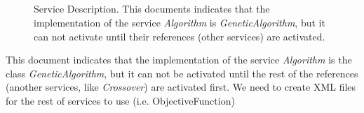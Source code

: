 \documentclass{sig-alternate}
\begin{document}
\begin{figure}[t]
{}\hlstd{\ \ %
}\hlstd{\ \ }\hlstd{}\hlstd{=}\hlstd{\hspace*{\fill}\\
}\hlstd{\ \ }\hlstd{}\hlstd{=}\hlstd{\hspace*{\fill}\\
}\hlstd{\ \ }\hlstd{}\hlstd{=}\hlstd{}\hlkwa{/$>$}\hspace*{\fill}\\
\hlstd{\ }\hlstd{}\hlstd{=}\hlstd{\hspace*{\fill}\\
}\hlstd{\ \ }\hlstd{}\hlstd{=}\hlstd{\hspace*{\fill}\\
}\hlstd{\ \ }\hlstd{}\hlstd{=}\hlstd{\hspace*{\fill}\\
}\hlstd{\ \ }\hlstd{}\hlstd{=}\hlstd{\hspace*{\fill}\\
}\hlstd{\ \ }\hlstd{}\hlstd{=}\hlstd{}\hlkwa{/$>$}\hspace*{\fill}\\
\hlstd{\ }\hlstd{}\hspace*{\fill}\\
\hlstd{}\hspace*{\fill}\\
\mbox{}

\normalfont
\label{fig:ds}
\caption{Service Description. This documents indicates that the implementation of the service {\em Algorithm} is {\em GeneticAlgorithm}, but it can not activate until their references (other services) are activated.}
\end {figure}

This document indicates that the implementation of the service {\em Algorithm} is the class {\em GeneticAlgorithm}, but it can not be activated until the rest of the references (another services, like {\em Crossover}) are activated first. We need to create XML files for the rest of services to use (i.e. ObjectiveFunction)
\end{document}
